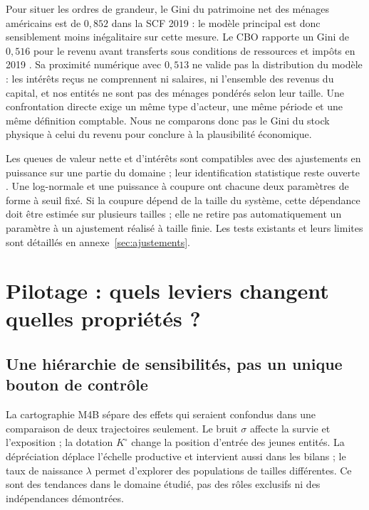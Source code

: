 Pour situer les ordres de grandeur, le Gini du patrimoine net des ménages
américains est de $0{,}852$ dans la SCF 2019 \cite{fedgini} : le modèle
principal est donc sensiblement moins inégalitaire sur cette mesure.
Le CBO rapporte un Gini de $0{,}516$ pour le revenu avant transferts sous
conditions de ressources et impôts en 2019 \cite{cbogini}. Sa proximité
numérique avec $0{,}513$ ne valide pas la distribution du modèle : les
intérêts reçus ne comprennent ni salaires, ni l'ensemble des revenus du
capital, et nos entités ne sont pas des ménages pondérés selon leur taille.
Une confrontation directe exige un même type d'acteur, une même période
et une même définition comptable. Nous ne comparons donc pas le Gini du
stock physique à celui du revenu pour conclure à la plausibilité économique.

Les queues de valeur nette et d'intérêts sont compatibles avec des
ajustements en puissance sur une partie du domaine ; leur identification
statistique reste ouverte \cite{clauset,wildauer}. Une log-normale et une
puissance à coupure ont chacune deux paramètres de forme à seuil fixé.
Si la coupure dépend de la taille du système, cette dépendance doit être
estimée sur plusieurs tailles ; elle ne retire pas automatiquement un
paramètre à un ajustement réalisé à taille finie. Les tests existants et
leurs limites sont détaillés en annexe~\ref{sec:ajustements}.

\section{Pilotage : quels leviers changent quelles propriétés ?}\label{sec:pilotage}
\subsection{Une hiérarchie de sensibilités, pas un unique bouton de contrôle}
La cartographie M4B sépare des effets qui seraient confondus dans une
comparaison de deux trajectoires seulement. Le bruit $\sigma$ affecte
la survie et l'exposition ; la dotation $K^\circ$ change la position d'entrée des
jeunes entités. La dépréciation déplace l'échelle productive et intervient
aussi dans les bilans ; le taux de naissance $\lambda$ permet d'explorer
des populations de tailles différentes. Ce sont des tendances dans le
domaine étudié, pas des rôles exclusifs ni des indépendances démontrées.


